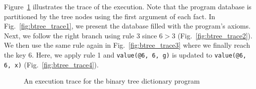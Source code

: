 \documentclass{sigplanconf}
\begin{document}
Figure~\ref{fig:btree_trace} illustrates the trace of the
execution. Note that the program database is partitioned by the tree
nodes using the first argument of each fact. In
Fig.~\ref{fig:btree_trace1}, we present the database filled with the
program's axioms. Next, we follow the right branch using rule 3 since
$6 > 3$ (Fig.~\ref{fig:btree_trace2}). We then use the same rule
again in Fig.~\ref{fig:btree_trace3} where we finally reach the key
6. Here, we apply rule 1 and \texttt{value(@6, 6, g)} is updated to
\texttt{value(@6, 6, x)} (Fig.~\ref{fig:btree_trace4}).

\begin{figure}[t]
\centering
{}
\caption{An execution trace for the binary tree dictionary program}
\label{fig:btree_trace}
\end{figure}
\end{document}
